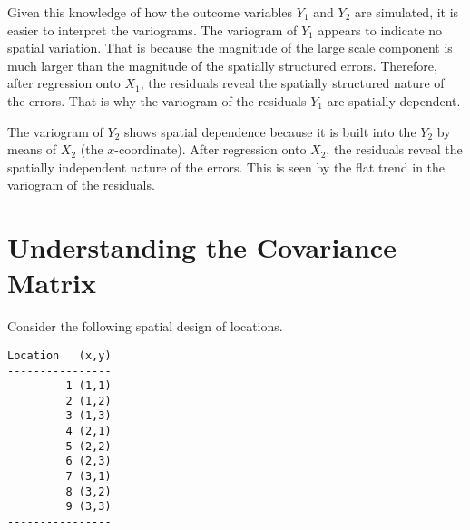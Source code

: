 \documentclass[letterpaper, 12pt]{article}
\begin{document}
\begin{enumerate}[(a)]
{\sf
Given this knowledge of how the outcome variables $Y_1$ and $Y_2$ are simulated, it is easier to interpret the variograms. The variogram of $Y_1$ appears to indicate no spatial variation. That is because the magnitude of the large scale component is much larger than the magnitude of the spatially structured errors. Therefore, after regression onto $X_1$, the residuals reveal the spatially structured nature of the errors. That is why the variogram of the residuals $Y_1$ are spatially dependent.

The variogram of $Y_2$ shows spatial dependence because it is built into the $Y_2$ by means of $X_2$ (the $x$-coordinate). After regression onto $X_2$, the residuals reveal the spatially independent nature of the errors. This is seen by the flat trend in the variogram of the residuals.
}
\end{enumerate}

\section{Understanding the Covariance Matrix}
Consider the following spatial design of locations.

\begin{verbatim}
Location   (x,y)
----------------
         1 (1,1)
         2 (1,2)
         3 (1,3)
         4 (2,1)
         5 (2,2)
         6 (2,3)
         7 (3,1)
         8 (3,2)
         9 (3,3)
----------------
\end{verbatim}
\end{document}
